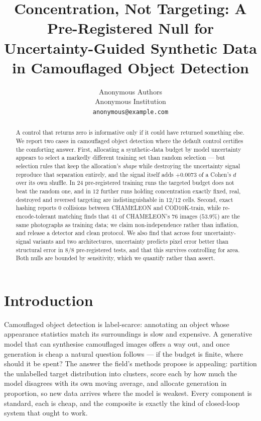 \documentclass{article} %
\title{Concentration, Not Targeting: A Pre-Registered Null for\\
Uncertainty-Guided Synthetic Data in Camouflaged Object Detection}
\author{Anonymous Authors \\
Anonymous Institution \\
\texttt{anonymous@example.com}
}
\begin{document}
\maketitle

\begin{abstract}
A control that returns zero is informative only if it could have returned something else. We report
two cases in camouflaged object detection where the default control certifies the comforting answer.
First, allocating a synthetic-data budget by model uncertainty appears to select a markedly different
training set than random selection --- but selection rules that keep the allocation's \emph{shape}
while destroying the uncertainty signal reproduce that separation entirely, and the signal itself adds
$+0.0073$ of a Cohen's $d$ over its own shuffle. In $24$ pre-registered training runs the targeted
budget does not beat the random one, and in $12$ further runs holding concentration exactly fixed,
real, destroyed and reversed targeting are indistinguishable in $12/12$ cells. Second, exact hashing
reports $0$ collisions between CHAMELEON and COD10K-train, while re-encode-tolerant matching finds
that $41$ of CHAMELEON's $76$ images ($53.9\%$) are the same photographs as training data; we claim
non-independence rather than inflation, and release a detector and clean protocol. We also find that
across four uncertainty-signal variants and two architectures, uncertainty predicts pixel error better
than structural error in $8/8$ pre-registered tests, and that this survives controlling for area. Both
nulls are bounded by sensitivity, which we quantify rather than assert.
\end{abstract}

\section{Introduction}
\label{sec:intro}

Camouflaged object detection is label-scarce: annotating an object whose appearance statistics match
its surroundings is slow and expensive. A generative model that can synthesise camouflaged images
offers a way out, and once generation is cheap a natural question follows --- if the budget is finite,
where should it be spent? The answer the field's methods propose is appealing: partition the unlabelled
target distribution into clusters, score each by how much the model disagrees with its own moving
average, and allocate generation in proportion, so new data arrives where the model is weakest. Every
component is standard, each is cheap, and the composite is exactly the kind of closed-loop system that
ought to work.
\end{document}
